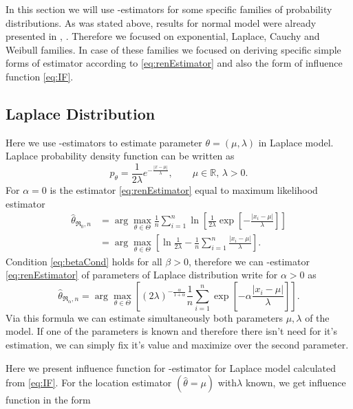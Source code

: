 
In this section we will use \mRa-estimators for some specific families of probability distributions. As was stated above, results for normal model were already presented in  \cite{Vajda2009}, \cite{Demut2010}. Therefore we focused on exponential, Laplace, Cauchy and Weibull families. In case of these families we focused on deriving specific simple forms of estimator according to \eqref{eq:renEstimator} and also the form of influence function \eqref{eq:IF}.

\subsection{Laplace Distribution} 
Here we use \mRa-estimators to estimate parameter $\theta = (\mu,\lambda)$ in Laplace model. Laplace probability density function can be written as 
\begin{equation}
	p_\theta = \frac{1}{2\lambda} e^{-\frac{|x-\mu|}{\lambda}}, \qquad \mu\in \mathbb{R},\, \lambda>0.
\end{equation}
For $\alpha = 0$ is the estimator \eqref{eq:renEstimator} equal to maximum likelihood estimator
\begin{align}
	\hat{\theta}_{\mathfrak{R}_0,n} & = \arg \max_{\theta \in \Theta} \frac{1}{n} \sum^n_{i=1} \ln \left[ \frac{1}{2\lambda}\exp \left[-\frac{|x_i-\mu|}{\lambda} \right] \right] \nonumber \\
	& =  \arg \max_{\theta \in \Theta} \left[ \ln \frac{1}{2\lambda} - \frac{1}{n} \sum^n_{i=1} \frac{|x_i-\mu|}{\lambda} \right].
\end{align}
Condition \ref{eq:betaCond} holds for all $\beta>0$, therefore we can \mRa-estimator \eqref{eq:renEstimator} of parameters of Laplace distribution write for $\alpha>0$ as
\begin{equation}
	\hat{\theta}_{\mathfrak{R}_\alpha,n} = \arg \max_{\theta \in \Theta} \left[ (2\lambda)^{-\frac{\alpha}{1+\alpha}} \frac{1}{n} \sum_{i=1}^n \exp \left[-\alpha\frac{|x_i-\mu|}{\lambda} \right] \right].
	\label{renyi-formula-laplace}
\end{equation}
Via this formula we can estimate simultaneously both parameters $\mu, \lambda$ of the model. If one of the parameters is known and therefore there isn't need for it's estimation, we can simply fix it's value and maximize over the second parameter.

Here we present influence function for \mRa-estimator for Laplace model calculated from \eqref{eq:IF}. For the location estimator $(\hat{\theta} = \mu)$ with$\lambda$ known, we get influence function in the form

